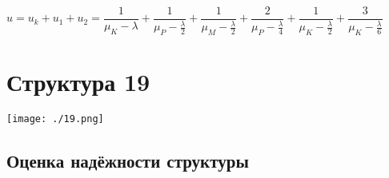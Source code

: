 \documentclass[12pt, a4paper] {ncc}
\begin{document}
		$u = u_k + u_1 + u_2 = 
		\dfrac {1} {\mu_K - \lambda} + 
		\dfrac {1} {\mu_P - \frac {\lambda} {2}} + \dfrac {1} {\mu_M - \frac {\lambda} {2}} +
		\dfrac {2} {\mu_P - \frac {\lambda}{4}} +
		\dfrac {1} {\mu_K - \frac {\lambda}{2}} +
		\dfrac {3} {\mu_K - \frac {\lambda}{6}}$



\section{Структура 19}
	\texttt{[image: ./19.png]}

    \subsection{Оценка надёжности структуры}
\end{document}
